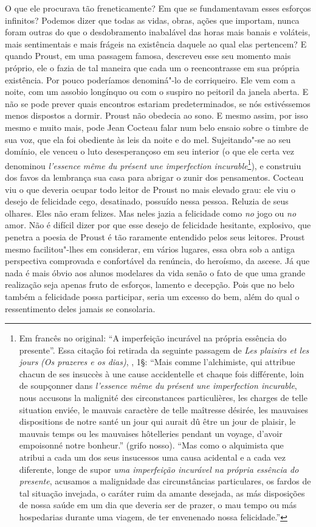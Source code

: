 O que ele procurava tão freneticamente? Em que se fundamentavam esses
esforços infinitos? Podemos dizer que todas as vidas, obras, ações que
importam, nunca foram outras do que o desdobramento inabalável das horas
mais banais e voláteis, mais sentimentais e mais frágeis na existência
daquele ao qual elas pertencem? E quando Proust, em uma passagem famosa,
descreveu esse seu momento mais próprio, ele o fazia de tal maneira que
cada um o reencontrasse em sua própria existência. Por pouco poderíamos
denominá"-lo de corriqueiro. Ele vem com a noite, com um assobio
longínquo ou com o suspiro no peitoril da janela aberta. E não se pode
prever quais encontros estariam predeterminados, se nós
estivéssemos menos dispostos a dormir. Proust não obedecia ao sono. E
mesmo assim, por isso mesmo e muito mais, pode Jean Cocteau falar num
belo ensaio sobre o timbre de sua voz, que ela foi obediente às leis da
noite e do mel. Sujeitando"-se ao seu domínio, ele venceu o luto
desesperançoso em seu interior (o que ele certa vez denominou
\emph{l'essence même du présent une imperfection incurable}\footnote{Em francês no original: ``A imperfeição incurável na própria essência
  do presente''. Essa citação foi retirada da seguinte passagem de
  \emph{Les plaisirs et les jours} \emph{(Os prazeres e os dias)}, ,
  1§: ``Mais comme l'alchimiste, qui attribue chacun de ses insuccès à
  une cause accidentelle et chaque fois différente, loin de soupçonner
  dans \emph{l'essence même du présent une imperfection incurable}, nous
  accusons la malignité des circonstances particulières, les charges de
  telle situation enviée, le mauvais caractère de telle maîtresse
  désirée, les mauvaises dispositions de notre santé un jour qui aurait
  dû être un jour de plaisir, le mauvais temps ou les mauvaises
  hôtelleries pendant un voyage, d'avoir empoisonné notre bonheur.''
  (grifo nosso). ``Mas como o alquimista que atribui a cada um dos
  seus insucessos uma causa acidental e a cada vez diferente, longe de
  supor \emph{uma imperfeição incurável na própria essência do
  presente}, acusamos a malignidade das circunstâncias particulares, os
  fardos de tal situação invejada, o caráter ruim da amante desejada, as
  más disposições de nossa saúde em um dia que deveria ser de prazer, o
  mau tempo ou más hospedarias durante uma viagem, de ter envenenado
  nossa felicidade.'' \versal{[N.~T.]}}), e construiu dos favos da lembrança sua casa
para abrigar o zunir dos pensamentos. Cocteau viu o que deveria ocupar
todo leitor de Proust no mais elevado grau: ele viu o desejo de
felicidade cego, desatinado, possuído nessa pessoa. Reluzia de seus
olhares. Eles não eram felizes. Mas neles jazia a felicidade como
\emph{no} jogo ou \emph{no} amor. Não é difícil dizer por que esse
desejo de felicidade hesitante, explosivo, que penetra a poesia de
Proust é tão raramente entendido pelos seus leitores. Proust mesmo
facilitou"-lhes em considerar, em vários lugares, essa obra sob a
antiga perspectiva comprovada e confortável da renúncia, do heroísmo, da
ascese. Já que nada é mais óbvio aos alunos modelares da vida senão o
fato de que uma grande realização seja apenas fruto de esforços, lamento
e decepção. Pois que no belo também a felicidade possa participar, seria
um excesso do bem, além do qual o ressentimento deles jamais se
consolaria.

